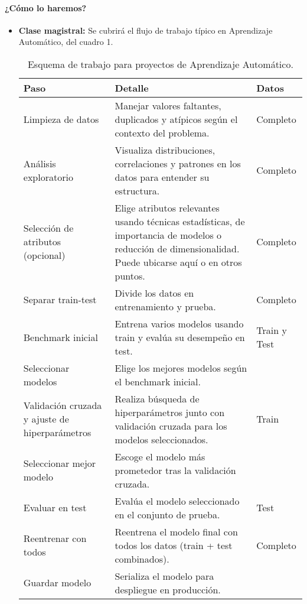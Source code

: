 \documentclass[a4,11pt]{aleph-notas}
\begin{document}
\paragraph{¿Cómo lo haremos?}  
\begin{itemize}[leftmargin=*]
    \item \textbf{Clase magistral:} Se cubrirá el flujo de trabajo típico en Aprendizaje Automático, del cuadro 1.

    \begin{table}[h]
        \centering\small
        \begin{tabular}{p{4.5cm}p{8.5cm}l}
            \toprule
            \textbf{Paso} & \textbf{Detalle} & \textbf{Datos} \\ \midrule
            Limpieza de datos 
            & Manejar valores faltantes, duplicados y atípicos según el contexto del problema. 
            & Completo \\ \midrule
            Análisis exploratorio 
            & Visualiza distribuciones, correlaciones y patrones en los datos para entender su estructura. 
            & Completo \\ \midrule
            Selección de atributos (opcional) 
            & Elige atributos relevantes usando técnicas estadísticas, de importancia de modelos o reducción de dimensionalidad. Puede ubicarse aquí o en otros puntos. 
            & Completo \\ \midrule
            Separar train-test 
            & Divide los datos en entrenamiento y prueba. 
            & Completo \\ \midrule
            Benchmark inicial 
            & Entrena varios modelos usando train y evalúa su desempeño en test. 
            & Train y Test \\ \midrule
            Seleccionar modelos 
            & Elige los mejores modelos según el benchmark inicial. 
            &  \\ \midrule
            Validación cruzada y ajuste de hiperparámetros
            & Realiza búsqueda de hiperparámetros junto con validación cruzada para los modelos seleccionados. 
            & Train \\ \midrule
            Seleccionar mejor modelo 
            & Escoge el modelo más prometedor tras la validación cruzada. 
            &  \\ \midrule
            Evaluar en test 
            & Evalúa el modelo seleccionado en el conjunto de prueba. 
            & Test \\ \midrule
            Reentrenar con todos 
            & Reentrena el modelo final con todos los datos (train + test combinados). 
            & Completo \\ \midrule
            Guardar modelo 
            & Serializa el modelo para despliegue en producción. 
            &  \\ \bottomrule
        \end{tabular}
        \caption{Esquema de trabajo para proyectos de Aprendizaje Automático.}
    \end{table}
\end{itemize}
\end{document}
